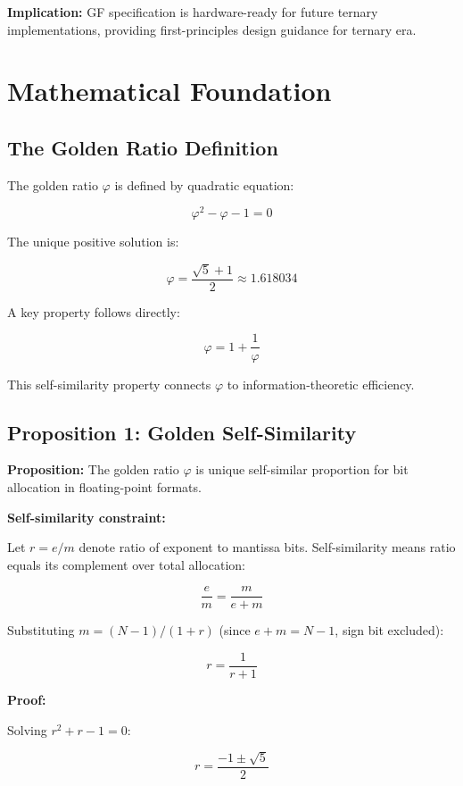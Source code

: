 \documentclass{article}
\begin{document}
\textbf{Implication:} GF specification is hardware-ready for future ternary implementations, providing first-principles design guidance for ternary era.


\section{Mathematical Foundation}

\subsection{The Golden Ratio Definition}

The golden ratio $\varphi$ is defined by quadratic equation:

$$\varphi^2 - \varphi - 1 = 0$$

The unique positive solution is:

$$\varphi = \frac{\sqrt{5} + 1}{2} \approx 1.618034$$

A key property follows directly:

$$\varphi = 1 + \frac{1}{\varphi}$$

This self-similarity property connects $\varphi$ to information-theoretic efficiency.

\subsection{Proposition 1: Golden Self-Similarity}

\textbf{Proposition:} The golden ratio $\varphi$ is unique self-similar proportion for bit allocation in floating-point formats.

\textbf{Self-similarity constraint:}

Let $r = e/m$ denote ratio of exponent to mantissa bits.
Self-similarity means ratio equals its complement over total allocation:

$$\frac{e}{m} = \frac{m}{e + m}$$

Substituting $m = (N-1)/(1+r)$ (since $e + m = N-1$, sign bit excluded):

$$r = \frac{1}{r + 1}$$

\textbf{Proof:}

Solving $r^2 + r - 1 = 0$:

$$r = \frac{-1 \pm \sqrt{5}}{2}$$
\end{document}

